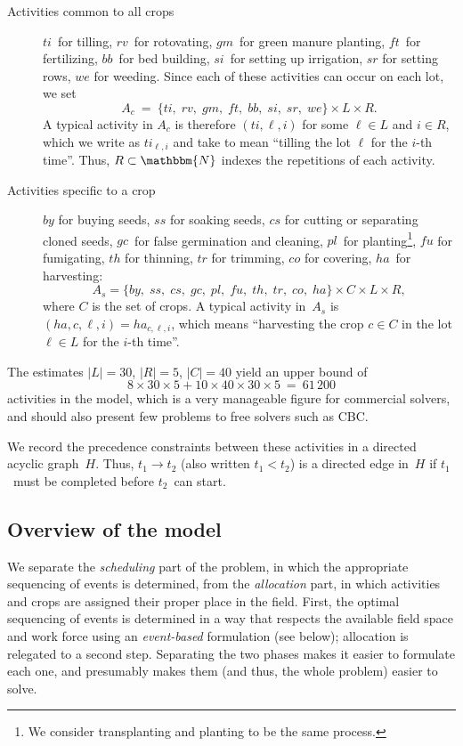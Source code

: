 \documentclass[11pt]{amsart}
\newcommand{\NN}{\mathbbm{N}}
\numberwithin{equation}{section}
\begin{document}
\begin{description}
\item[Activities common to all crops]  $ti$~for tilling, $rv$~for
  rotovating, $gm$~for green manure planting, $f\!t$~for fertilizing,
  $bb$~for bed building, $si$~for setting up irrigation, $sr$ for
  setting rows, $we$ for weeding. Since each of these activities can
  occur on each lot, we set
  \[
     A_c 
     \ = \
     \{ ti,\;rv,\;gm,\;f\!t,\;bb,\;si,\;sr,\;we\} \times L \times R.
  \]
  A typical activity in $A_c$ is therefore $(ti,\ell, i)$ for some
  $\ell\in L$ and $i\in R$, which we write as $ti_{\ell, i}$ and take
  to mean ``tilling the lot $\ell$ for the $i$-th time''. Thus,
  $R\subset\NN$ indexes the repetitions of each activity.

\smallskip
\item[Activities specific to a crop] $by$ for buying seeds, $ss$ for
  soaking seeds, $cs$ for cutting or separating cloned seeds, $gc$~for
  false germination and cleaning, $pl$~for planting\footnote{We
    consider transplanting and planting to be the same process.},
  $f\!u$ for fumigating, $th$ for thinning, $tr$ for trimming, $co$
  for covering, $ha$~for harvesting:
  \[
     A_s = \{ by,\;ss,\;cs,\;gc,\;pl,\;f\!u,\;th,\;tr,\;co,\;ha\}
     \times C \times L \times R,
  \]
  where $C$ is the set of crops. A typical activity in~$A_s$ is
  $(ha,c,\ell, i)=ha_{c,\ell, i}$, which means ``harvesting the crop $c\in
  C$ in the lot $\ell\in L$ for the $i$-th time''.
\end{description}

The estimates $|L|=30$, $|R|=5$, $|C|=40$ yield an upper bound of
\[
    8 \times 30 \times 5 + 10 \times 40 \times 30 \times 5
    \ = \
    61\,200
\]
activities in the model, which is a very manageable figure for
commercial solvers, and should also present few problems to free
solvers such as CBC.

We record the precedence constraints between these activities in a directed
acyclic graph~$H$. Thus, $t_1\longrightarrow t_2$ (also written
$t_1<t_2$) is a directed edge in~$H$ if $t_1$~must be completed
before $t_2$~can start.

\subsection{Overview of the model}


We separate the \emph{scheduling} part of the problem, in which the
appropriate sequencing of events is determined, from the
\emph{allocation} part, in which activities and crops are assigned
their proper place in the field. First, the optimal sequencing of
events is determined in a way that respects the available field space
and work force using an \emph{event-based} formulation (see below);
allocation is relegated to a second step. Separating the two phases
makes it easier to formulate each one, and presumably makes them (and
thus, the whole problem) easier to solve.
\end{document}
